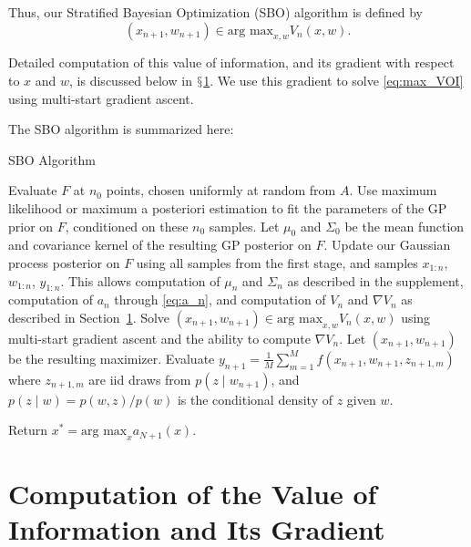 \documentclass{article}
\newcommand{\w}{w}
\newcommand{\z}{z}
\begin{document}
Thus, our Stratified Bayesian Optimization (SBO) algorithm is defined by
\begin{equation}
    \left(x_{n+1},\w_{n+1}\right)\in\mbox{arg max}_{x,\w}V_{n}\left(x,\w\right).  \label{eq:max_VOI}
\end{equation}

Detailed computation of this value of information, and its gradient with respect to $x$ and $\w$, is discussed below in $\mathsection$\ref{sec:VOI}.  We use this gradient to solve \eqref{eq:max_VOI} using multi-start gradient ascent.

The SBO algorithm is summarized here:
\begin{algorithm}[!htb]
   \caption{SBO Algorithm}
   \label{alg:SBO}
\begin{algorithmic}[1]
	 Evaluate $F$ at $n_0$ points, chosen uniformly at random from $A$. 
   		Use maximum likelihood or maximum a posteriori estimation to fit the parameters of the GP prior on $F$, conditioned on these 				$n_0$ samples. Let $\mu_0$ and $\Sigma_0$ be the mean function and covariance kernel of the resulting GP posterior on $F$.
	\STATE Update our Gaussian process posterior on $F$ using all samples from the first stage, and samples $x_{1:n}$,$\w_{1:n}$,						$y_{1:n}$.  This allows computation of $\mu_n$ and $\Sigma_n$ as described in the supplement, computation of $a_{n}$ through 			\eqref{eq:a_n}, and computation of $V_{n}$ and $\nabla V_{n}$ as described in Section~\ref{sec:VOI}.
	\STATE Solve $\left(x_{n+1},\w_{n+1}\right)\in\mbox{arg max}_{x,\w}V_{n}\left(x,\w\right)$ using multi-start gradient ascent and the 		ability to compute $\nabla V_n$. Let $\left(x_{n+1},\w_{n+1}\right)$
		be the resulting maximizer.
	\STATE Evaluate $y_{n+1}=\frac{1}{M}\sum_{m=1}^{M}f\left(x_{n+1},\w_{n+1},\z_{n+1,m}\right)$
		where $\z_{n+1,m}$ are iid draws from  $p\left(\z\mid w_{n+1}\right)$,
		and $p(z\mid \w) = p(\w,\z)/p(\w)$ is the conditional density of $\z$ given $\w$.
	\ENDFOR

\STATE Return $x^{*}=\mbox{arg max}_{x}a_{N+1}\left(x\right).$
\end{algorithmic}
\end{algorithm}

\section{Computation of the Value of Information and Its Gradient}
\label{sec:VOI}
\end{document}
